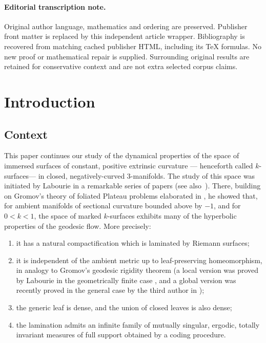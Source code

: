 \documentclass[11pt]{article}
\newcommand{\ksurfaces}{$k$\nobreakdash-surfaces\xspace}
\theoremstyle{plain}
\theoremstyle{definition}
\begin{document}
\paragraph{Editorial transcription note.}
Original author language, mathematics and ordering are preserved. Publisher front matter is replaced by this independent article wrapper. Bibliography is recovered from matching cached publisher HTML, including its TeX formulas. No new proof or mathematical repair is supplied. Surrounding original results are retained for conservative context and are not extra selected corpus claims.
\clearpage

\section{Introduction}

\subsection{Context}
This paper continues our study of the dynamical properties of the space of immersed surfaces of constant, positive extrinsic curvature --- henceforth called \ksurfaces --- in closed, negatively-curved $3$\nobreakdash-manifolds. The study of this space was initiated by Labourie in a remarkable series of papers \cite{LabourieGAFA,LabourieInvent,LabourieAnnals} (see also~\cite{Labourie_phase_space}). There, building on Gromov's theory of foliated Plateau problems elaborated in \hbox{\cite{Gromov_FolPlateau1,Gromov_FolPlateau2}}, he showed that, for ambient manifolds of sectional curvature bounded above by $-1$, and for $0<k<1$, the space of marked \ksurfaces exhibits many of the hyperbolic properties of the geodesic flow. More precisely:
\begin{enumerate}
\item it has a natural compactification which is laminated by Riemann surfaces;
\item it is independent of the ambient metric up to leaf-preserving homeomorphism, in analogy to Gromov's geodesic rigidity theorem \cite{Gromov3} (a local version was proved by Labourie in the geometrically finite case \cite{LabourieInvent}, and a global version was recently proved in the general case by the third author in \cite{Smith_asymp});
\item the generic leaf is dense, and the union of closed leaves is also dense;
\item the lamination admits an infinite family of mutually singular, ergodic, totally invariant measures of full support obtained by a coding procedure.
\end{enumerate}
\end{document}
